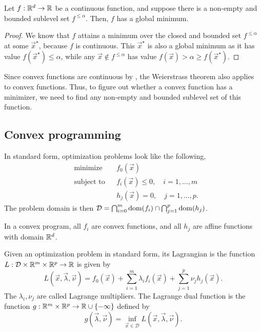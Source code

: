 \begin{theorem}[Weierstrass]
    Let $f: \mathbb{R}^d \to \mathbb{R}$ be a continuous function, and suppose there is a non-empty and bounded
    sublevel set $f^{\leq \alpha}$. Then, $f$ has a global minimum.
\end{theorem}

\begin{proof}
    We know that $f$ attains a minimum over the closed and bounded set $f^{\leq \alpha}$ at some
    $\vec{x}^\star$, because $f$ is continuous. This $\vec{x}^\star$ is also a global minimum as it
    has value $f(\vec{x}^\star) \leq \alpha$, while any $\vec{x} \not\in f^{\leq \alpha}$ has value
    $f(\vec{x}) > \alpha \geq f(\vec{x}^\star)$.
\end{proof}

Since convex functions are continuous by , the Weierstrass theorem also
applies to convex functions. Thus, to figure out whether a convex function has a minimizer, we need
to find any non-empty and bounded sublevel set of this function.

\subsection{Convex programming}

In standard form, optimization problems look like the following, \[
    \begin{aligned}
    &\text{minimize}   && f_0(\vec{x}) \\
    &\text{subject to} && f_i(\vec{x}) \leq 0, \quad i = 1,\ldots,m \\
    &                  && h_j(\vec{x}) = 0,    \quad j = 1, \ldots, p.
    \end{aligned}
\]
The problem domain is then $\mathcal{D} = \bigcap_{i=0}^m \mathrm{dom}(f_i) \cap \bigcap_{j=1}^p \mathrm{dom}(h_j)$.

In a convex program, all $f_i$ are convex functions, and all $h_j$ are affine functions with domain $\mathbb{R}^d$.

\begin{definition}
    Given an optimization problem in standard form, its Lagrangian is the function $L: \mathcal{D} \times \mathbb{R}^m \times \mathbb{R}^p \to \mathbb{R}$ is given by \[
        L(\vec{x},\vec{\lambda},\vec{\nu}) = f_0(\vec{x}) + \sum_{i=1}^{m} \lambda_i f_i(\vec{x}) + \sum_{j=1}^{p} \nu_j h_j(\vec{x}).
    \]
    The $\lambda_i,\nu_j$ are called Lagrange multipliers. The Lagrange dual function is the function $g: \mathbb{R}^m \times \mathbb{R}^p \to \mathbb{R} \cup \{ -\infty \}$ defined by \[
        g(\vec{\lambda},\vec{\nu}) = \inf_{\vec{x}\in \mathcal{D}} L(\vec{x},\vec{\lambda},\vec{\nu}).
    \]
\end{definition}

